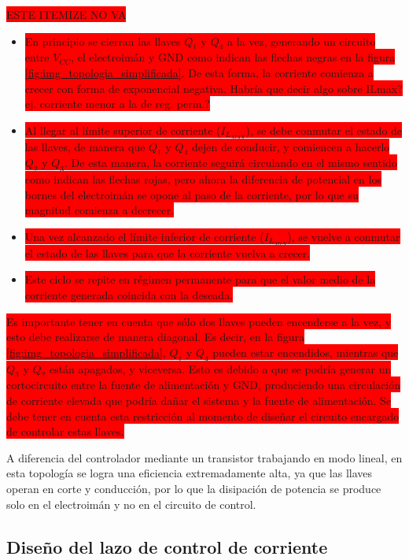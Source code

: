 \colorbox{red}{ESTE ITEMIZE NO VA}
\begin{itemize}
	\item \colorbox{red}{En principio se cierran las llaves $Q_1$ y $Q_4$ a la vez, generando un circuito entre $V_{CC}$, el electroimán y GND como indican las flechas negras en la figura \ref{fig:img_topologia_simplificada}. De esta forma, la corriente comienza a crecer con forma de exponencial negativa. }
	\colorbox{red}{Habría que decir algo sobre ILmax? ej. corriente menor a la de reg. perm.?}
	\item \colorbox{red}{Al llegar al límite superior de corriente ($I_{L_{MAX}}$), se debe conmutar el estado de las llaves, de manera que $Q_1$ y $Q_4$ dejen de conducir, y comiencen a hacerlo $Q_2$ y $Q_3$. De esta manera, la corriente seguirá circulando en el mismo sentido como indican las flechas rojas, pero ahora la diferencia de potencial en los bornes del electroimán se opone al paso de la corriente, por lo que su magnitud comienza a decrecer.}
	\item \colorbox{red}{Una vez alcanzado el límite inferior de corriente ($I_{L_{MIN}}$), se vuelve a conmutar el estado de las llaves para que la corriente vuelva a crecer.}
	\item \colorbox{red}{Este ciclo se repite en régimen permanente para que el valor medio de la corriente generada coincida con la deseada. }
\end{itemize}
\colorbox{red}{
Es importante tener en cuenta que sólo dos llaves pueden encenderse a la vez, y esto debe realizarse de manera diagonal. Es decir, en la figura \ref{fig:img_topologia_simplificada}, $Q_1$ y $Q_4$ pueden estar encendidos, mientras que $Q_3$ y $Q_2$ están apagados, y viceversa. Esto es debido a que se podría generar un cortocircuito entre la fuente de alimentación y GND, produciendo una circulación de corriente elevada que podría dañar el sistema y la fuente de alimentación. Se debe tener en cuenta esta restricción al momento de diseñar el circuito encargado de controlar estas llaves.
}

A diferencia del controlador mediante un transistor trabajando en modo lineal, en esta topología se logra una eficiencia extremadamente alta, ya que las llaves operan en corte y conducción, por lo que la disipación de potencia se produce solo en el electroimán y no en el circuito de control.

\subsection{Diseño del lazo de control de corriente}

